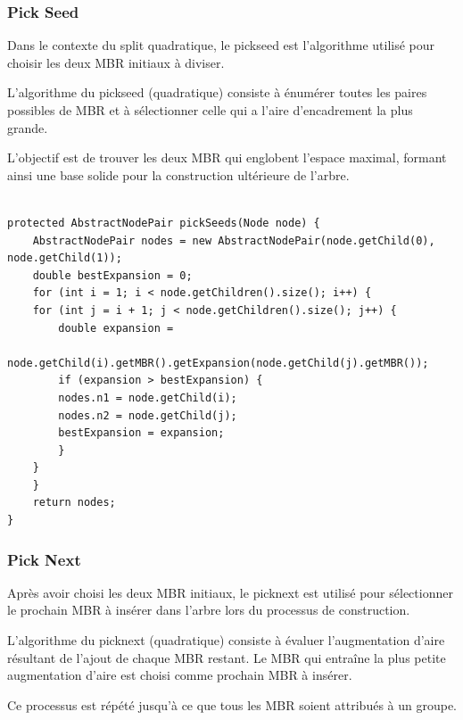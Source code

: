 \documentclass {article}
\begin{document}
\subsubsection {Pick Seed}


Dans le contexte du split quadratique, le pickseed est l'algorithme utilisé pour choisir les 
deux MBR initiaux à diviser.

L'algorithme du pickseed (quadratique) consiste à énumérer toutes les paires possibles de MBR et à sélectionner 
celle qui a l'aire d'encadrement la plus grande.

L'objectif est de trouver les deux MBR qui englobent l'espace maximal, formant ainsi une base solide 
pour la construction ultérieure de l'arbre.

\begin{verbatim}

protected AbstractNodePair pickSeeds(Node node) {
    AbstractNodePair nodes = new AbstractNodePair(node.getChild(0), node.getChild(1));
    double bestExpansion = 0;
    for (int i = 1; i < node.getChildren().size(); i++) {
	for (int j = i + 1; j < node.getChildren().size(); j++) {
	    double expansion = 
		    node.getChild(i).getMBR().getExpansion(node.getChild(j).getMBR());
	    if (expansion > bestExpansion) {
		nodes.n1 = node.getChild(i);
		nodes.n2 = node.getChild(j);
		bestExpansion = expansion;
	    }
	}
    }
    return nodes;
}

\end{verbatim}


\subsubsection {Pick Next}

Après avoir choisi les deux MBR initiaux, le picknext est utilisé pour sélectionner le prochain MBR 
à insérer dans l'arbre lors du processus de construction.

L'algorithme du picknext (quadratique) consiste à évaluer l'augmentation d'aire résultant de l'ajout de chaque MBR 
restant. Le MBR qui entraîne la plus petite augmentation d'aire est choisi 
comme prochain MBR à insérer.

Ce processus est répété jusqu'à ce que tous les MBR soient attribués à un groupe.
\end{document}
